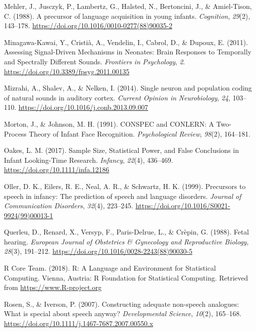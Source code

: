 \documentclass[man,floatsintext]{apa6}
\begin{document}
\leavevmode\hypertarget{ref-mehler_precursor_1988}{}%
Mehler, J., Jusczyk, P., Lambertz, G., Halsted, N., Bertoncini, J., \& Amiel-Tison, C. (1988). A precursor of language acquisition in young infants. \emph{Cognition}, \emph{29}(2), 143--178. \url{https://doi.org/10.1016/0010-0277(88)90035-2}

\leavevmode\hypertarget{ref-minagawa-kawai_assessing_2011}{}%
Minagawa-Kawai, Y., Cristià, A., Vendelin, I., Cabrol, D., \& Dupoux, E. (2011). Assessing Signal-Driven Mechanisms in Neonates: Brain Responses to Temporally and Spectrally Different Sounds. \emph{Frontiers in Psychology}, \emph{2}. \url{https://doi.org/10.3389/fpsyg.2011.00135}

\leavevmode\hypertarget{ref-mizrahi_single_2014}{}%
Mizrahi, A., Shalev, A., \& Nelken, I. (2014). Single neuron and population coding of natural sounds in auditory cortex. \emph{Current Opinion in Neurobiology}, \emph{24}, 103--110. \url{https://doi.org/10.1016/j.conb.2013.09.007}

\leavevmode\hypertarget{ref-morton_conspec_1991}{}%
Morton, J., \& Johnson, M. H. (1991). CONSPEC and CONLERN: A Two-Process Theory of Infant Face Recognition. \emph{Psychological Review}, \emph{98}(2), 164--181.

\leavevmode\hypertarget{ref-oakes_sample_2017}{}%
Oakes, L. M. (2017). Sample Size, Statistical Power, and False Conclusions in Infant Looking-Time Research. \emph{Infancy}, \emph{22}(4), 436--469. \url{https://doi.org/10.1111/infa.12186}

\leavevmode\hypertarget{ref-oller_precursors_1999}{}%
Oller, D. K., Eilers, R. E., Neal, A. R., \& Schwartz, H. K. (1999). Precursors to speech in infancy: The prediction of speech and language disorders. \emph{Journal of Communication Disorders}, \emph{32}(4), 223--245. \url{https://doi.org/10.1016/S0021-9924(99)00013-1}

\leavevmode\hypertarget{ref-querleu_fetal_1988}{}%
Querleu, D., Renard, X., Versyp, F., Paris-Delrue, L., \& Crèpin, G. (1988). Fetal hearing. \emph{European Journal of Obstetrics \& Gynecology and Reproductive Biology}, \emph{28}(3), 191--212. \url{https://doi.org/10.1016/0028-2243(88)90030-5}

\leavevmode\hypertarget{ref-r_core_team_r:_2018}{}%
R Core Team. (2018). R: A Language and Environment for Statistical Computing. Vienna, Austria: R Foundation for Statistical Computing. Retrieved from \url{https://www.R-project.org}

\leavevmode\hypertarget{ref-rosen_constructing_2007}{}%
Rosen, S., \& Iverson, P. (2007). Constructing adequate non-speech analogues: What is special about speech anyway? \emph{Developmental Science}, \emph{10}(2), 165--168. \url{https://doi.org/10.1111/j.1467-7687.2007.00550.x}
\end{document}

